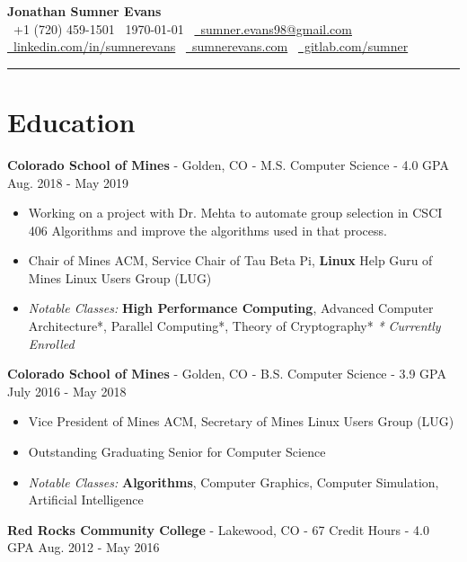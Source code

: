 \documentclass[10pt,letterpaper]{article}
\begin{document}
\begin{center}
    {\huge\textbf{Jonathan Sumner Evans}} \\
    \vspace{3pt}
    \faPhone\ +1 (720) 459-1501
    \textbar\ \today
    \textbar\ \href{mailto:sumner.evans98@gmail.com}{\faEnvelope\ sumner.evans98@gmail.com} \\
    \href{https://www.linkedin.com/in/sumnerevans}{\faLinkedin\ linkedin.com/in/sumnerevans}
    \textbar\ \href{https://sumnerevans.com}{\faGlobe\ sumnerevans.com}
    \textbar\ \href{https://gitlab.com/sumner}{\faGitlab\ gitlab.com/sumner}
    \rule{\textwidth}{0.5pt}
\end{center}

\section*{Education}
\textbf{Colorado School of Mines} - Golden, CO - M.S. Computer Science - 4.0 GPA
\hfill Aug. 2018 - May 2019
\begin{itemize}
    \item Working on a project with Dr. Mehta to automate group selection in
        CSCI 406 Algorithms and improve the algorithms used in that process.
    \item Chair of Mines ACM, Service Chair of Tau Beta Pi, \textbf{Linux} Help
        Guru of Mines Linux Users Group (LUG)
    \item \textit{Notable Classes:} \textbf{High Performance Computing},
        Advanced Computer Architecture*, Parallel Computing*, Theory of
        Cryptography* \hfill\textit{* Currently Enrolled}
\end{itemize}

\textbf{Colorado School of Mines} - Golden, CO - B.S. Computer Science - 3.9 GPA
\hfill July 2016 - May 2018
\begin{itemize}
    \item Vice President of Mines ACM, Secretary of Mines Linux Users Group
        (LUG)
    \item Outstanding Graduating Senior for Computer Science
    \item \textit{Notable Classes:} \textbf{Algorithms}, Computer Graphics,
        Computer Simulation, Artificial Intelligence
\end{itemize}

\vspace{2pt}
\textbf{Red Rocks Community College} - Lakewood, CO - 67 Credit Hours - 4.0 GPA
\hfill Aug. 2012 - May 2016
\end{document}
